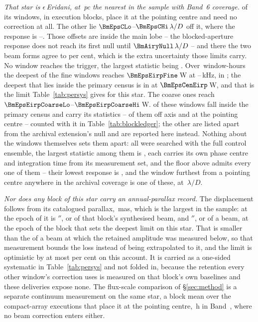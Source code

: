 \emph{That star is $\epsilon$\,Eridani, at \BmEpsDistPc\,pc the nearest in the
sample with Band~6 coverage.} \BmEpsNOn{} of its \BmEpsNWin{} windows, in
\BmEpsNBlock{} execution blocks, place it at the pointing centre and need no
correction at all. The other \BmEpsNOff{} lie
$\BmEpsCLo$--$\BmEpsCHi\,\lambda/D$ off it, where the response is
\BmEpsRespLo--\BmEpsRespHi. Those offsets are inside the main lobe -- the
blocked-aperture response does not reach its first null until
$\BmAiryNull\,\lambda/D$ -- and there the two beam forms agree to
\BmEpsAgreePct{} per cent, which is the extra uncertainty those limits carry.
No window reaches the trigger, the largest statistic being \BmEpsTMax. Over
\BmEpsHours\,window-hours the deepest of the \BmEpsNFine{} fine windows
reaches $\BmEpsEirpFine$\,W at
\BmEpsChanFineKHzLo--\BmEpsChanFineKHzHi\,kHz, in \BmEpsExtEb; the deepest
that lies inside the primary census is in \BmEpsCenEb{} at
$\BmEpsCenEirp$\,W, and that is the limit Table~\ref{tab:persys} gives for
this star. The
\BmEpsNCoarse{} coarse ones reach
$\BmEpsEirpCoarseLo$--$\BmEpsEirpCoarseHi$\,W. \BmEpsNCensus{} of these
windows fall inside the primary census and carry its statistics --
\BmEpsNCensusOff{} of them off axis and \BmEpsNCensusOn{} at the pointing
centre -- counted with it in Table~\ref{tab:blockledger}; the other
\BmEpsNExt{} are listed apart from the archival extension's null and are
reported here instead. Nothing about the windows themselves sets them apart:
all \ExNSearched{} were searched with the full control ensemble, the largest
statistic among them is \ExTMax, each carries its own phase centre and
integration time from its measurement set, and the floor above admits every
one of them -- their lowest response is \ExRespMin, and the window furthest
from a pointing centre anywhere in the archival coverage is one of these, at
\ExCWorstExt\,$\lambda/D$.

\emph{Nor does any block of this star carry an annual-parallax record.} The
displacement follows from its catalogued parallax, \BmEpsPlxMas\,mas, which
is the largest in the sample: at the epoch of \BmEpsCenEb{} it is
\ExCenPxArcsec$''$, or \ExCenPxBeams{} of that block's synthesised beam, and
\ExBestPxArcsec$''$, or \ExBestPxBeams{} of a beam, at the epoch of the block
that sets the deepest limit on this star.
That is smaller than the \SensPxSmallBeams{} of a beam at which the retained
amplitude was measured below, so that measurement bounds the loss instead of
being extrapolated to it, and the limit is optimistic by at most
\BmEpsPxBoundPct{} per cent on this account. It is carried as a one-sided
systematic in Table~\ref{tab:persys} and not folded in, because the
retention every other window's correction uses is measured on that block's
own baselines and these deliveries expose none. The
flux-scale
comparison of \S\ref{sec:method} is a separate continuum measurement on the
same star, a block mean over the \PxEpsN{} compact-array executions that place
it at the pointing centre, \PxEpsHours\,h in Band~\PxEpsBand, where no beam
correction enters either.

